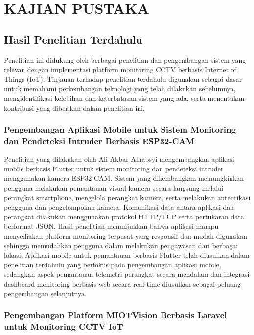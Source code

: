 \chapter{KAJIAN PUSTAKA}
\label{sec:chap2_kajian_pustaka}

\section{Hasil Penelitian Terdahulu}

Penelitian ini didukung oleh berbagai penelitian dan pengembangan sistem yang relevan dengan implementasi platform monitoring CCTV berbasis Internet of Things (IoT). Tinjauan terhadap penelitian terdahulu digunakan sebagai dasar untuk memahami perkembangan teknologi yang telah dilakukan sebelumnya, mengidentifikasi kelebihan dan keterbatasan sistem yang ada, serta menentukan kontribusi yang diberikan dalam penelitian ini.

\subsection{Pengembangan Aplikasi Mobile untuk Sistem Monitoring dan Pendeteksi Intruder Berbasis ESP32-CAM}

Penelitian yang dilakukan oleh Ali Akbar Alhabsyi mengembangkan aplikasi mobile berbasis Flutter untuk sistem monitoring dan pendeteksi intruder menggunakan kamera ESP32-CAM. Sistem yang dikembangkan memungkinkan pengguna melakukan pemantauan visual kamera secara langsung melalui perangkat smartphone, mengelola perangkat kamera, serta melakukan autentikasi pengguna dan pengelompokan kamera. Komunikasi data antara aplikasi dan perangkat dilakukan menggunakan protokol HTTP/TCP serta pertukaran data berformat JSON. Hasil penelitian menunjukkan bahwa aplikasi mampu menyediakan platform monitoring terpusat yang responsif dan mudah digunakan sehingga memudahkan pengguna dalam melakukan pengawasan dari berbagai lokasi. Aplikasi mobile untuk pemantauan berbasis Flutter telah diusulkan dalam penelitian terdahulu yang berfokus pada pengembangan aplikasi mobile, sedangkan aspek pemantauan telemetri perangkat secara mendalam dan integrasi dashboard monitoring berbasis web secara real-time diusulkan sebagai peluang pengembangan selanjutnya. \cite{ali2025}

\subsection{Pengembangan Platform MIOTVision Berbasis Laravel untuk Monitoring CCTV IoT}

